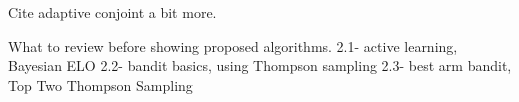 \documentclass[nonblindrev]{informs3}
\begin{document}
Cite adaptive conjoint a bit more. 


What to review before showing proposed algorithms. 
2.1- active learning, Bayesian ELO
2.2- bandit basics, using Thompson sampling
2.3- best arm bandit, Top Two Thompson Sampling











\end{document}
